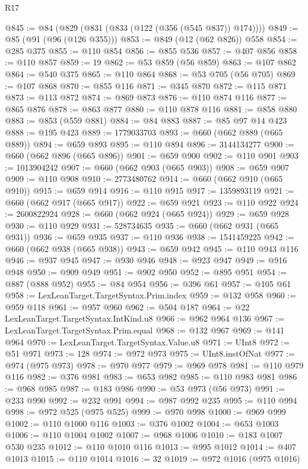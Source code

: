\begin{lexlean}{R17}
\begin{coremodule}
@845 := @84 (@829 (@831 (@833 (@122 (@356 (@545 @837)) @174))))
@849 := @85 (@91 (@96 (@126 @355)))
@853 := @849 (@12 (@62 @826)) @558
@854 := @285 @375
@855 := @110 @854
@856 := @855 @536
@857 := @407 @856
@858 := @110 @857
@859 := 19
@862 := @53 @859 (@56 @859)
@863 := @107 @862
@864 := @540 @375
@865 := @110 @864
@868 := @53 @705 (@56 @705)
@869 := @107 @868
@870 := @855 @116
@871 := @345 @870
@872 := @115 @871
@873 := @113 @872
@874 := @869 @873
@876 := @110 @874 @116
@877 := @865 @876
@878 := @863 @877
@880 := @110 @878 @116
@881 := @858 @880
@883 := @853 (@559 @881)
@884 := @84 @883
@887 := @85 @97 @14 @423
@888 := @195 @423
@889 := 1779033703
@893 := @660 (@662 @889 (@665 @889))
@894 := @659 @893
@895 := @110 @894
@896 := 3144134277
@900 := @660 (@662 @896 (@665 @896))
@901 := @659 @900
@902 := @110 @901
@903 := 1013904242
@907 := @660 (@662 @903 (@665 @903))
@908 := @659 @907
@909 := @110 @908
@910 := 2773480762
@914 := @660 (@662 @910 (@665 @910))
@915 := @659 @914
@916 := @110 @915
@917 := 1359893119
@921 := @660 (@662 @917 (@665 @917))
@922 := @659 @921
@923 := @110 @922
@924 := 2600822924
@928 := @660 (@662 @924 (@665 @924))
@929 := @659 @928
@930 := @110 @929
@931 := 528734635
@935 := @660 (@662 @931 (@665 @931))
@936 := @659 @935
@937 := @110 @936
@938 := 1541459225
@942 := @660 (@662 @938 (@665 @938))
@943 := @659 @942
@945 := @110 @943 @116
@946 := @937 @945
@947 := @930 @946
@948 := @923 @947
@949 := @916 @948
@950 := @909 @949
@951 := @902 @950
@952 := @895 @951
@954 := @887 (@888 @952)
@955 := @84 @954
@956 := @396 @61
@957 := @105 @61
@958 := LexLeanTarget.TargetSyntax.Prim.index
@959 := @132 @958
@960 := @959 @118
@961 := @957 @960
@962 := @504 @187
@964 := @22 LexLeanTarget.TargetSyntax.IntKind.u8
@966 := @962 @964 @136
@967 := LexLeanTarget.TargetSyntax.Prim.equal
@968 := @132 @967
@969 := @141 @964
@970 := LexLeanTarget.TargetSyntax.Value.u8
@971 := UInt8
@972 := @51 @971
@973 := 128
@974 := @972 @973
@975 := UInt8.instOfNat
@977 := @974 (@975 @973)
@978 := @970 @977
@979 := @969 @978
@981 := @110 @979 @116
@982 := @376 @981
@983 := @653 @982
@985 := @110 @983 @981
@986 := @968 @985
@987 := @183 @986
@990 := @53 @973 (@56 @973)
@991 := @233 @990
@992 := @232 @991
@994 := @987 @992 @235
@995 := @110 @994
@998 := @972 @525 (@975 @525)
@999 := @970 @998
@1000 := @969 @999
@1002 := @110 @1000 @116
@1003 := @376 @1002
@1004 := @653 @1003
@1006 := @110 @1004 @1002
@1007 := @968 @1006
@1010 := @183 @1007 @530 @235
@1012 := @110 @1010 @116
@1013 := @995 @1012
@1014 := @407 @1013
@1015 := @110 @1014
@1016 := 32
@1019 := @972 @1016 (@975 @1016)

\end{coremodule}
\end{lexlean}
